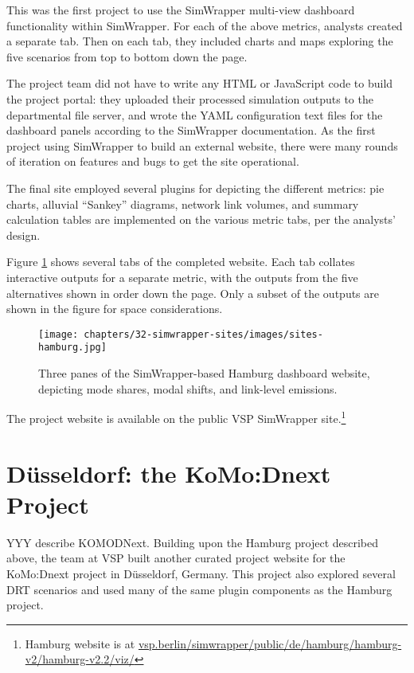 This was the first project to use the SimWrapper multi-view dashboard functionality within SimWrapper. For each of the above metrics, analysts created a separate tab. Then on each tab, they included charts and maps exploring the five scenarios from top to bottom down the page.

The project team did not have to write any HTML or JavaScript code to build the project portal: they uploaded their processed simulation outputs to the departmental file server, and wrote the YAML configuration text files for the dashboard panels according to the SimWrapper documentation. As the first project using SimWrapper to build an external website, there were many rounds of iteration on features and bugs to get the site operational.

The final site employed several plugins for depicting the different metrics: pie charts, alluvial ``Sankey'' diagrams, network link volumes, and summary calculation tables are implemented on the various metric tabs, per the analysts' design.

Figure \ref{fig:sites-hamburg} shows several tabs of the completed website. Each tab collates interactive outputs for a separate metric, with the outputs from the five alternatives shown in order down the page. Only a subset of the outputs are shown in the figure for space considerations.

\begin{figure}[ht]
  \centering
  \texttt{[image: chapters/32-simwrapper-sites/images/sites-hamburg.jpg]}
  \caption{Three panes of the SimWrapper-based Hamburg dashboard website, depicting mode shares, modal shifts, and link-level emissions.}
  \label{fig:sites-hamburg}
\end{figure}

The project website is available on the public VSP SimWrapper site.\footnote{Hamburg website is at \href{https://vsp.berlin/simwrapper/public/de/hamburg/hamburg-v2/hamburg-v2.2/viz/}{vsp.berlin/simwrapper/public/de/hamburg/hamburg-v2/hamburg-v2.2/viz/}}

\section{Düsseldorf: the KoMo:Dnext Project}
\label{sites-komodnext}

YYY describe KOMODNext. Building upon the Hamburg project described above, the team at VSP built another curated project website for the KoMo:Dnext project in Düsseldorf, Germany. This project also explored several \gls{DRT} scenarios and used many of the same plugin components as the Hamburg project.

